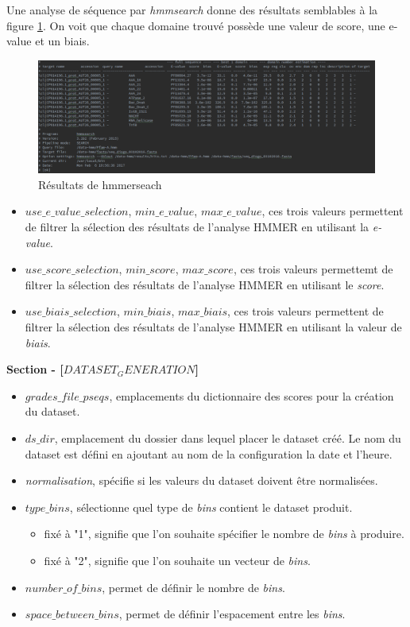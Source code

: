 Une analyse de séquence par \emph{hmmsearch} donne des résultats semblables à la figure \ref{fig:hmmseach}. On voit que chaque domaine trouvé possède une valeur de score, une e-value et un biais.

\begin{figure}[H] 
\centering 
\includegraphics[width=1\columnwidth]{img/hmmsearchresult} 
\caption[hmmseach]{Résultats de hmmerseach}
\label{fig:hmmseach} 
\end{figure}

\begin{itemize}
\item \emph{$use\_e\_value\_selection$}, \emph{$min\_e\_value$}, \emph{$max\_e\_value$}, ces trois valeurs permettent de filtrer la sélection des résultats de l'analyse HMMER en utilisant la \emph{e-value}.
\item \emph{$use\_score\_selection$}, \emph{$min\_score$}, \emph{$max\_score$}, ces trois valeurs permettemt de filtrer la sélection des résultats de l'analyse HMMER en utilisant le \emph{score}.
\item \emph{$use\_biais\_selection$}, \emph{$min\_biais$}, \emph{$max\_biais$}, ces trois valeurs permettent de filtrer la sélection des résultats de l'analyse HMMER en utilisant la valeur de  \emph{biais}.
\end{itemize}

\textbf{Section - [$DATASET_GENERATION$]}

\begin{itemize}
\item \emph{$grades\_file\_pseqs$}, emplacements du dictionnaire des scores pour la création du dataset.
\item \emph{$ds\_dir$}, emplacement du dossier dans lequel placer le dataset créé. Le nom du dataset est défini en ajoutant au nom de la configuration la date et l'heure.
\item \emph{normalisation}, spécifie si les valeurs du dataset doivent être normalisées.
\item \emph{$type\_bins$}, sélectionne quel type de \emph{bins} contient le dataset produit.
\begin{itemize}
\item fixé à "1", signifie que l'on souhaite spécifier le nombre de \emph{bins} à produire.
\item fixé à "2", signifie que l'on souhaite un vecteur de \emph{bins}.
\end{itemize}
\item \emph{$number\_of\_bins$}, permet de définir le nombre de \emph{bins}.
\item \emph{$space\_between\_bins$}, permet de définir l'espacement entre les \emph{bins}.
\end{itemize}


